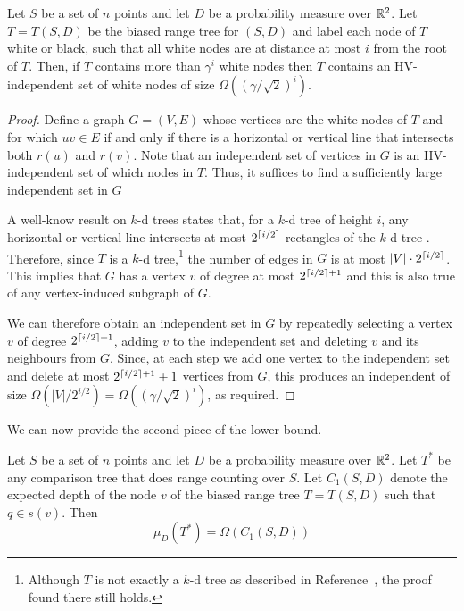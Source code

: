 \documentclass[charterfonts]{patmorin}
\begin{document}
\begin{lem}
Let $S$ be a set of $n$ points and let $D$ be a probability measure
over $\mathbb{R}^2$.
Let $T=T(S,D)$ be the biased range tree for $(S,D)$ and label
each node of $T$ white
or black, such that all white nodes are at distance at most $i$ from
the root of $T$.  Then, if $T$ contains more than $\gamma^i$ white nodes
then $T$ contains an HV-independent set of white nodes of size
$\Omega((\gamma/\sqrt{2})^i)$.
\end{lem}

\begin{proof}
Define a graph $G=(V,E)$ whose vertices are the white nodes of $T$ and
for which $uv\in E$ if and only if there is a horizontal or vertical line that
intersects both $r(u)$ and $r(v)$.  Note that an independent set of
vertices in $G$ is an HV-independent set of which nodes in $T$.  Thus,
it suffices to find a sufficiently large independent set in $G$

A well-know result on $k$-d trees states that, for a $k$-d tree of
height $i$, any horizontal or vertical line intersects at most
$2^{\left\lceil i/2 \right\rceil}$ rectangles of the $k$-d tree
\cite[Lemma~5.4]{bkos97}.  Therefore, since $T$ is a $k$-d
tree,\footnote{Although $T$ is not exactly a $k$-d tree as described
in Reference~\cite{bkos97}, the proof found there still holds.} the
number of edges in $G$ is at most $|V|\cdot 2^{\left\lceil i/2 \right\rceil}$.  This
implies that $G$ has a vertex $v$ of degree at most $2^{\left\lceil i/2 \right\rceil+1}$
and this is also true of any vertex-induced subgraph of $G$.

We can therefore obtain an independent set in $G$ by repeatedly
selecting a vertex $v$ of degree $2^{\left\lceil i/2 \right\rceil+1}$, adding $v$ to the
independent set and deleting $v$ and its neighbours from $G$.  Since, at
each step we add one vertex to the independent set and delete at most
$2^{\left\lceil i/2 \right\rceil+1}+1$ vertices from $G$, this produces an independent of size
$\Omega(|V|/2^{i/2}) = \Omega((\gamma/\sqrt{2})^i)$, as required.
\end{proof}

We can now provide the second piece of the lower bound.

\begin{lem}
Let $S$ be a set of $n$ points and let $D$ be a probability measure
over $\mathbb{R}^2$.
Let $T^*$ be any comparison tree that does range counting over $S$. Let
$C_1(S,D)$ denote the expected depth of the node $v$ of the biased
range tree $T=T(S,D)$ such that $q\in s(v)$.  Then
\[
    \mu_D(T^*) = \Omega(C_1(S,D))
\]
\end{lem}
\end{document}
